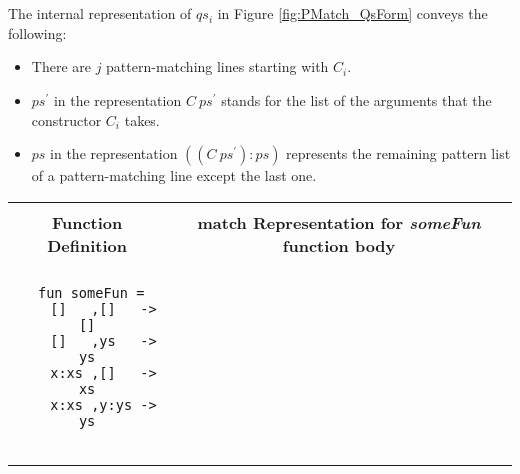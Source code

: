 \documentclass[11pt]{article}
\begin{document}
~~\\~~\\
The internal representation of $qs_i$ in Figure \ref {fig:PMatch_QsForm} conveys the following:
\begin{itemize}
  \item There are $j$ pattern-matching lines starting with $C_i$.
  \item $ps^\prime$ in the representation $C~ps^\prime$ stands for the list of the arguments that the constructor $C_i$ takes.
  \item $ps$ in the representation $((C~ps^\prime):ps)$ represents the remaining pattern list of a pattern-matching line except the last one.
\end{itemize}
\begin{table}[h!]
\begin{center}
\begin{tabular}{|c|c|} \hline
{}& {}\\
{\bf Function Definition} & {\bf match Representation for \textit{someFun} function body} \\ 
{}& {}\\
\hline
\begin{minipage}{2.1in}
\begin{verbatim}
 fun someFun =
    []   ,[]   -> []
    []   ,ys   -> ys
    x:xs ,[]   -> xs
    x:xs ,y:ys -> ys


\end{verbatim}
\end{minipage}
\end{tabular}
\end{center}
\end{table}
\end{document}
